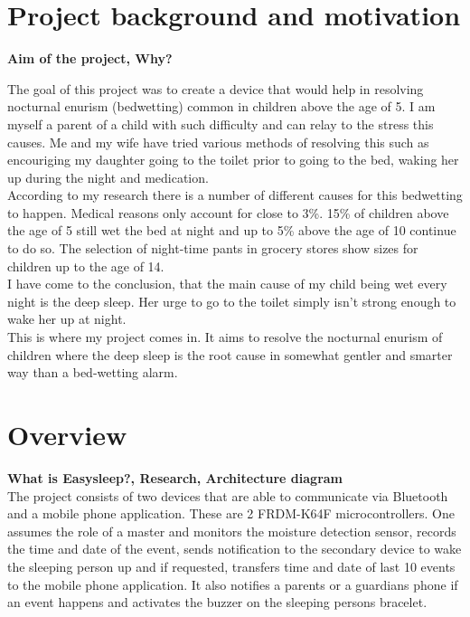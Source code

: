 \documentclass[12pt,a4paper]{article}
\begin{document}
	\section{Project background and motivation}
	{\bfseries Aim of the project, Why?}
	
	The goal of this project was to create a device that would help in resolving nocturnal enurism (bedwetting) common in children above the age of 5. I am myself a parent of a child with such difficulty and can relay to the stress this causes. Me and my wife have tried various methods of resolving this such as encouriging my daughter going to the toilet prior to going to the bed, waking her up during the night and medication.\\
	
	According to my research there is a number of different causes for this bedwetting to happen. Medical reasons only account for close to 3\%. 15\% of children above the age of 5 still wet the bed at night and up to 5\% above the age of 10 continue to do so. The selection of night-time pants in grocery stores show sizes for children up to the age of 14.\\
	
	I have come to the conclusion, that the main cause of my child being wet every night is the 
	deep sleep. Her urge to go to the toilet simply isn't strong enough to wake her up at night.\\
	
	This is where my project comes in. It aims to resolve the nocturnal enurism of children 
	where the deep sleep is the root cause in somewhat gentler and smarter way than a bed-wetting
	alarm.
	\newpage
	
	\section{Overview}
	{\bfseries What is Easysleep?, Research, Architecture diagram}\\
	
	The project consists of two devices that are able to communicate via Bluetooth and a mobile phone application. These are 2 FRDM-K64F microcontrollers. One assumes the role of a master and 
	monitors the moisture detection sensor, records the time and date of the event, sends 
	notification to the secondary device to wake the sleeping person up and if requested, 
	transfers time and date of last 10 events to the mobile phone application. It also notifies a 
	parents or a guardians phone if an event happens and activates the buzzer on the sleeping 
	persons bracelet.\\
	
\end{document}

